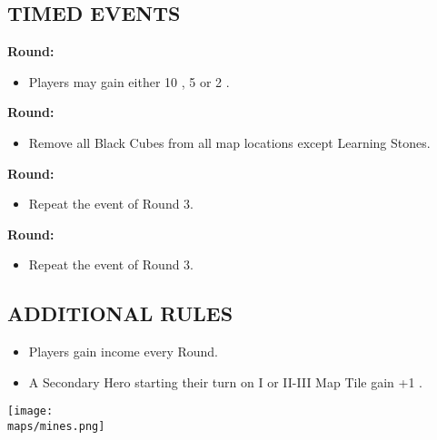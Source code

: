 \begin{multicols*}{2}
\subsection*{\MakeUppercase{Timed Events}}
\textbf{ Round:}
\begin{itemize}
  \item Players may gain either 10 , 5  or 2 .
\end{itemize}
\textbf{ Round:}
\begin{itemize}
  \item Remove all Black Cubes from all map locations except Learning Stones.
\end{itemize}
\textbf{ Round:}
\begin{itemize}
  \item Repeat the event of Round 3.
\end{itemize}
\textbf{ Round:}
\begin{itemize}
  \item Repeat the event of Round 3.
\end{itemize}

\subsection*{\MakeUppercase{Additional Rules}}
\begin{itemize}
  \item Players gain income every Round.
  \item A Secondary Hero starting their turn on I or II-III Map Tile gain +1 .
\end{itemize}

\begin{center}
  \vfill
  \texttt{[image: \\maps/mines.png]}
  \vfill
\end{center}

\end{multicols*}

